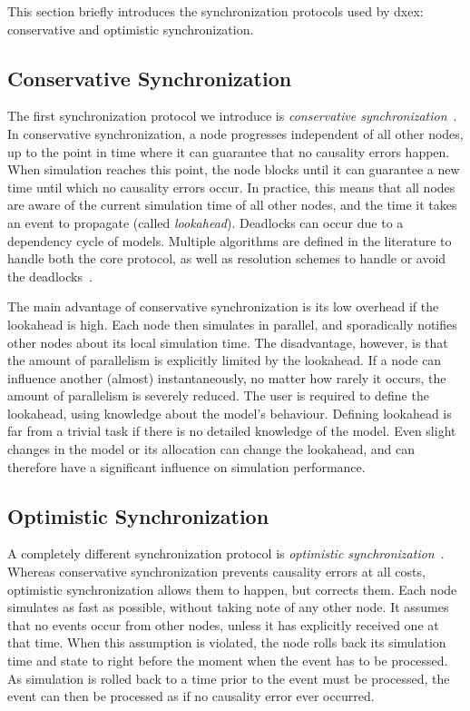 This section briefly introduces the synchronization protocols used by dxex: conservative and optimistic synchronization.

\subsection{Conservative Synchronization}
The first synchronization protocol we introduce is \textit{conservative synchronization}~\cite{FujimotoBook}.
In conservative synchronization, a node progresses independent of all other nodes, up to the point in time where it can guarantee that no causality errors happen.
When simulation reaches this point, the node blocks until it can guarantee a new time until which no causality errors occur.
In practice, this means that all nodes are aware of the current simulation time of all other nodes, and the time it takes an event to propagate (called \textit{lookahead}).
Deadlocks can occur due to a dependency cycle of models.
Multiple algorithms are defined in the literature to handle both the core protocol, as well as resolution schemes to handle or avoid the deadlocks~\cite{FujimotoBook}.

The main advantage of conservative synchronization is its low overhead if the lookahead is high.
Each node then simulates in parallel, and sporadically notifies other nodes about its local simulation time.
The disadvantage, however, is that the amount of parallelism is explicitly limited by the lookahead.
If a node can influence another (almost) instantaneously, no matter how rarely it occurs, the amount of parallelism is severely reduced.
The user is required to define the lookahead, using knowledge about the model's behaviour.
Defining lookahead is far from a trivial task if there is no detailed knowledge of the model.
Even slight changes in the model or its allocation can change the lookahead, and can therefore have a significant influence on simulation performance.

\subsection{Optimistic Synchronization}
A completely different synchronization protocol is \textit{optimistic synchronization}~\cite{TimeWarp}.
Whereas conservative synchronization prevents causality errors at all costs, optimistic synchronization allows them to happen, but corrects them.
Each node simulates as fast as possible, without taking note of any other node.
It assumes that no events occur from other nodes, unless it has explicitly received one at that time.
When this assumption is violated, the node rolls back its simulation time and state to right before the moment when the event has to be processed.
As simulation is rolled back to a time prior to the event must be processed, the event can then be processed as if no causality error ever occurred.

